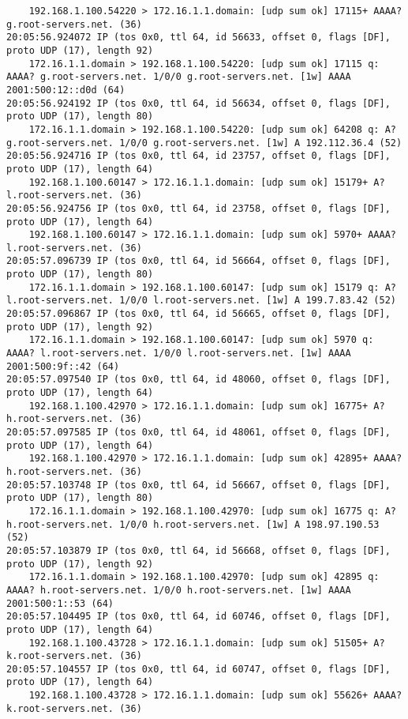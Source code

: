\documentclass{article}
\begin{document}
{\begin{lstlisting}
    192.168.1.100.54220 > 172.16.1.1.domain: [udp sum ok] 17115+ AAAA? g.root-servers.net. (36)
20:05:56.924072 IP (tos 0x0, ttl 64, id 56633, offset 0, flags [DF], proto UDP (17), length 92)
    172.16.1.1.domain > 192.168.1.100.54220: [udp sum ok] 17115 q: AAAA? g.root-servers.net. 1/0/0 g.root-servers.net. [1w] AAAA 2001:500:12::d0d (64)
20:05:56.924192 IP (tos 0x0, ttl 64, id 56634, offset 0, flags [DF], proto UDP (17), length 80)
    172.16.1.1.domain > 192.168.1.100.54220: [udp sum ok] 64208 q: A? g.root-servers.net. 1/0/0 g.root-servers.net. [1w] A 192.112.36.4 (52)
20:05:56.924716 IP (tos 0x0, ttl 64, id 23757, offset 0, flags [DF], proto UDP (17), length 64)
    192.168.1.100.60147 > 172.16.1.1.domain: [udp sum ok] 15179+ A? l.root-servers.net. (36)
20:05:56.924756 IP (tos 0x0, ttl 64, id 23758, offset 0, flags [DF], proto UDP (17), length 64)
    192.168.1.100.60147 > 172.16.1.1.domain: [udp sum ok] 5970+ AAAA? l.root-servers.net. (36)
20:05:57.096739 IP (tos 0x0, ttl 64, id 56664, offset 0, flags [DF], proto UDP (17), length 80)
    172.16.1.1.domain > 192.168.1.100.60147: [udp sum ok] 15179 q: A? l.root-servers.net. 1/0/0 l.root-servers.net. [1w] A 199.7.83.42 (52)
20:05:57.096867 IP (tos 0x0, ttl 64, id 56665, offset 0, flags [DF], proto UDP (17), length 92)
    172.16.1.1.domain > 192.168.1.100.60147: [udp sum ok] 5970 q: AAAA? l.root-servers.net. 1/0/0 l.root-servers.net. [1w] AAAA 2001:500:9f::42 (64)
20:05:57.097540 IP (tos 0x0, ttl 64, id 48060, offset 0, flags [DF], proto UDP (17), length 64)
    192.168.1.100.42970 > 172.16.1.1.domain: [udp sum ok] 16775+ A? h.root-servers.net. (36)
20:05:57.097585 IP (tos 0x0, ttl 64, id 48061, offset 0, flags [DF], proto UDP (17), length 64)
    192.168.1.100.42970 > 172.16.1.1.domain: [udp sum ok] 42895+ AAAA? h.root-servers.net. (36)
20:05:57.103748 IP (tos 0x0, ttl 64, id 56667, offset 0, flags [DF], proto UDP (17), length 80)
    172.16.1.1.domain > 192.168.1.100.42970: [udp sum ok] 16775 q: A? h.root-servers.net. 1/0/0 h.root-servers.net. [1w] A 198.97.190.53 (52)
20:05:57.103879 IP (tos 0x0, ttl 64, id 56668, offset 0, flags [DF], proto UDP (17), length 92)
    172.16.1.1.domain > 192.168.1.100.42970: [udp sum ok] 42895 q: AAAA? h.root-servers.net. 1/0/0 h.root-servers.net. [1w] AAAA 2001:500:1::53 (64)
20:05:57.104495 IP (tos 0x0, ttl 64, id 60746, offset 0, flags [DF], proto UDP (17), length 64)
    192.168.1.100.43728 > 172.16.1.1.domain: [udp sum ok] 51505+ A? k.root-servers.net. (36)
20:05:57.104557 IP (tos 0x0, ttl 64, id 60747, offset 0, flags [DF], proto UDP (17), length 64)
    192.168.1.100.43728 > 172.16.1.1.domain: [udp sum ok] 55626+ AAAA? k.root-servers.net. (36)

\end{lstlisting}}
\end{document}
